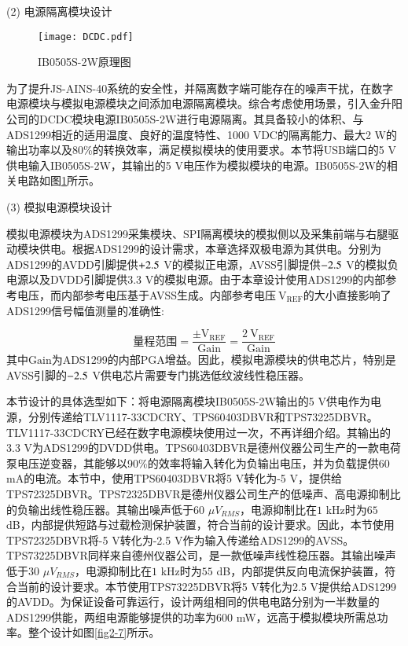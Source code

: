 (2) 电源隔离模块设计

\begin{figure}[!h]
	\centering
	\texttt{[image: DCDC.pdf]}
	\caption{IB0505S-2W原理图}
	\label{fig2-6}
\end{figure}

为了提升JS-AINS-40系统的安全性，并隔离数字端可能存在的噪声干扰，在数字电源模块与模拟电源模块之间添加电源隔离模块。综合考虑使用场景，引入金升阳公司的DCDC模块电源IB0505S-2W进行电源隔离。其具备较小的体积、与ADS1299相近的适用温度、良好的温度特性、1000 VDC的隔离能力、最大2 W的输出功率以及80\%的转换效率，满足模拟模块的使用要求。本节将USB端口的5 V供电输入IB0505S-2W，其输出的5 V电压作为模拟模块的电源。IB0505S-2W的相关电路如图\ref{fig2-6}所示。

(3) 模拟电源模块设计

模拟电源模块为ADS1299采集模块、SPI隔离模块的模拟侧以及采集前端与右腿驱动模块供电。根据ADS1299的设计需求，本章选择双极电源为其供电。分别为ADS1299的AVDD引脚提供$\rm +2.5$ V的模拟正电源，AVSS引脚提供$\rm -2.5$ V的模拟负电源以及DVDD引脚提供3.3 V的模拟电源。由于本章设计使用ADS1299的内部参考电压，而内部参考电压基于AVSS生成。内部参考电压$\mathrm{~V}_{\mathrm{REF}}$的大小直接影响了ADS1299信号幅值测量的准确性:

\begin{equation}
    \label{deqn_ex2_1}
\text{量程范围} =\frac{\pm \mathrm{V}_{\mathrm{REF}}}{\text { Gain }}=\frac{2 \mathrm{~V}_{\mathrm{REF}}}{\text { Gain }}
\end{equation}
其中$\text{Gain}$为ADS1299的内部PGA增益。因此，模拟电源模块的供电芯片，特别是AVSS引脚的$\rm -2.5$ V供电芯片需要专门挑选低纹波线性稳压器。

本节设计的具体选型如下：将电源隔离模块IB0505S-2W输出的5 V供电作为电源，分别传递给TLV1117-33CDCRY、TPS60403DBVR和TPS73225DBVR。TLV1117-33CDCRY已经在数字电源模块使用过一次，不再详细介绍。其输出的3.3 V为ADS1299的DVDD供电。TPS60403DBVR是德州仪器公司生产的一款电荷泵电压逆变器，其能够以90\%的效率将输入转化为负输出电压，并为负载提供60 mA的电流。本节中，使用TPS60403DBVR将5 V转化为-5 V，提供给TPS72325DBVR。TPS72325DBVR是德州仪器公司生产的低噪声、高电源抑制比的负输出线性稳压器。其输出噪声低于60 $\mu V_{RMS}$，电源抑制比在$1$ kHz时为$65$ dB，内部提供短路与过载检测保护装置，符合当前的设计要求。因此，本节使用TPS72325DBVR将-5 V转化为-2.5 V作为输入传递给ADS1299的AVSS。TPS73225DBVR同样来自德州仪器公司，是一款低噪声线性稳压器。其输出噪声低于30 $\mu V_{RMS}$，电源抑制比在$1$ kHz时为$55$ dB，内部提供反向电流保护装置，符合当前的设计要求。本节使用TPS73225DBVR将5 V转化为2.5 V提供给ADS1299的AVDD。为保证设备可靠运行，设计两组相同的供电电路分别为一半数量的ADS1299供能，两组电源能够提供的功率为600 mW，远高于模拟模块所需总功率。整个设计如图\ref{fig2-7}所示。

